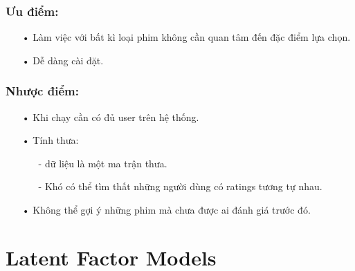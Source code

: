 \documentclass[a4paper,11pt]{report}
\begin{document}
\subsection{Ưu điểm:}
\begin{itemize}
\item[•] Làm việc với bất kì loại phim không cần quan tâm đến đặc điểm lựa chọn.
\item[•] Dễ dàng cài đặt. 
\end{itemize}
\subsection{Nhược điểm:}
\begin{itemize}
\item[•] Khi chạy cần có đủ user trên hệ thống.
\item[•] Tính thưa:
\begin{itemize}
\item[-] dữ liệu là một ma trận thưa.
\item[-] Khó có thể tìm thất những người dùng có ratings tương tự nhau.
\end{itemize}
\item[•] Không thể gợi ý những phim mà chưa được ai đánh giá trước đó.
\end{itemize}
\chapter{Latent Factor Models}
\end{document}
